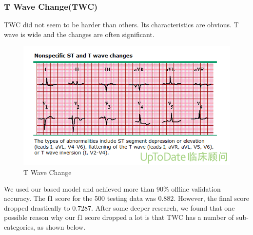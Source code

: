 \documentclass[runningheads]{llncs}
\begin{document}
\subsubsection{T Wave Change(TWC)}
TWC did not seem to be harder than others. Its characteristics are obvious. T wave is wide and the changes are often significant.
\begin{figure}[H]
	\includegraphics[width=\linewidth]{img/twc.png}
	\caption{\label{fig:twc} T Wave Change \cite{UptoDate}}
\end{figure}
We used our based model and achieved more than $90\%$ offline validation accuracy. The f1 score for the 500 testing data was $0.882$. However, the final score dropped drastically to $0.7287$. After some deeper research, we found that one possible reason why our f1 score dropped a lot is that TWC has a number of sub-categories, as shown below.
\end{document}
